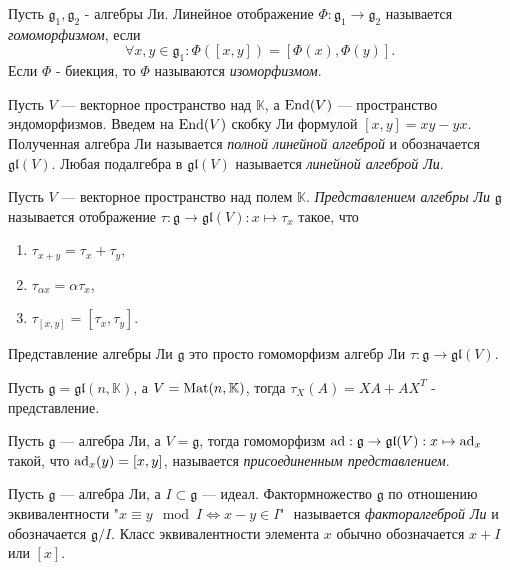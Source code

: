 \begin{defi}
Пусть  $\mathfrak{g}_1,\mathfrak{g}_2$ - алгебры Ли. Линейное отображение $\Phi:\mathfrak{g}_1\to\mathfrak{g}_2$ называется \textit{гомоморфизмом}, если $$\forall x,y\in\mathfrak{g}_1:\Phi([x,y])=[\Phi(x),\Phi(y)].$$
Если $\Phi$ - биекция, то $\Phi$ называются \textit{изоморфизмом}.
\end{defi}

\begin{defi}
Пусть $V$ — векторное пространство над $\mathbb{K}$, а $\operatorname{End}(V)$ — пространство эндоморфизмов. Введем на $\operatorname{End}(V)$ скобку Ли формулой $[x,y]=xy-yx$. Полученная алгебра Ли называется \textit{полной линейной алгеброй} и обозначается $\mathfrak{gl}(V)$. Любая подалгебра в $\mathfrak{gl}(V)$ называется \textit{линейной алгеброй Ли}.
\end{defi}

\begin{defi}
Пусть $V$ — векторное пространство над полем $\mathbb{K}$. \textit{Представлением алгебры Ли} $\mathfrak{g}$ называется отображение ${\tau:\mathfrak{g}\to\mathfrak{gl}(V):x\mapsto\tau_x}$ такое, что
\begin{enumerate}
\item $\tau_{x+y}=\tau_x+\tau_y$,
\item $\tau_{\alpha x} = \alpha\tau_x$,
\item $\tau_{[x,y]}=[\tau_x,\tau_y]$.
\end{enumerate}
\end{defi}

\begin{remark}
Представление алгебры Ли $\mathfrak{g}$ это просто гомоморфизм алгебр Ли $\tau:\mathfrak{g}\to\mathfrak{gl}(V)$.
\end{remark}

\begin{ass}
Пусть $\mathfrak{g}=\mathfrak{gl}(n,\mathbb{K})$, а $V=\operatorname{Mat}(n,\mathbb{K})$, тогда $\tau_X(A)=XA+AX^T$ - представление.
\end{ass}

\begin{defi}
Пусть $\mathfrak{g}$ — алгебра Ли, а $V=\mathfrak{g}$, тогда гомоморфизм $\operatorname{ad}:\mathfrak{g}\to\mathfrak{gl}(V):x\mapsto \operatorname{ad}_x$ такой, что $\operatorname{ad}_x(y) = [x,y]$, называется \textit{присоединенным представлением}.
\end{defi}

\begin{defi}
Пусть $\mathfrak{g}$ — алгебра Ли, а $I\subset\mathfrak{g}$ — идеал. Фактормножество $\mathfrak{g}$ по отношению эквивалентности "$x\equiv y\mod I \Leftrightarrow x-y\in I$" $ $ называется \textit{факторалгеброй Ли} и обозначается $\mathfrak{g}/I$. Класс эквивалентности элемента $x$ обычно обозначается $x+I$ или $[x]$.
\end{defi}

